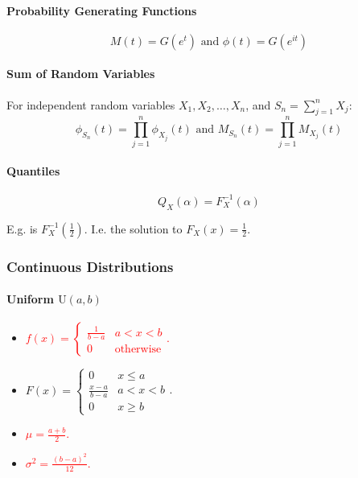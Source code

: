 \documentclass[twocolumn,english]{article}
\let\emph\relax
\begin{document}
\paragraph{Probability Generating Functions}

\[
M\left(t\right)=G\left(e^{t}\right)\text{ and }\phi\left(t\right)=G\left(e^{it}\right)
\]



\paragraph{Sum of Random Variables}

For independent random variables $X_{1},X_{2},\dots,X_{n}$, and $S_{n}=\sum_{j=1}^{n}X_{j}$:
\[
\phi_{S_{n}}\left(t\right)=\prod_{j=1}^{n}\phi_{X_{j}}\left(t\right)\text{ and }M_{S_{n}}\left(t\right)=\prod_{j=1}^{n}M_{X_{j}}\left(t\right)
\]



\paragraph{Quantiles}

\[
Q_{X}\left(\alpha\right)=F_{X}^{-1}\left(\alpha\right)
\]


E.g. \emph{median} is $F_{X}^{-1}\left(\frac{1}{2}\right)$. I.e.
the solution to $F_{X}\left(x\right)=\frac{1}{2}$.


\subsubsection{Continuous Distributions}


\paragraph{Uniform $\text{U}\left(a,b\right)$}
\begin{itemize}
\item \textrm{\textcolor{red}{$f\left(x\right)=\begin{cases}
\frac{1}{b-a} & a<x<b\\
0 & \text{otherwise}
\end{cases}$. }}
\item $F\left(x\right)=\begin{cases}
0 & x\leq a\\
\frac{x-a}{b-a} & a<x<b\\
0 & x\geq b
\end{cases}$. 
\item \textrm{\textcolor{red}{$\mu=\frac{a+b}{2}$. }}
\item \textrm{\textcolor{red}{$\sigma^{2}=\frac{\left(b-a\right)^{2}}{12}$. }}
\end{itemize}
\end{document}
